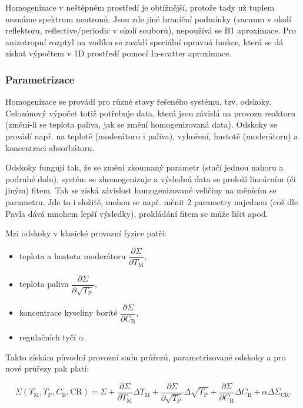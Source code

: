 Homogenizace v neštěpném prostředí je obtížnější, protože tady už tuplem neznáme spektrum neutronů. Jsou zde jiné hraniční podmínky (vacuum v okolí reflektoru, reflective/periodic v okolí souborů), nepoužívá se B1 aproximace. Pro anizotropní rozptyl na vodíku se zavádí speciální opravná funkce, která se dá získat výpočtem v 1D prostředí pomocí In-scatter aproximace.

\subsubsection{Parametrizace}

Homogenizace se provádí pro různé stavy řešeného systému, tzv. odskoky. Celozónový výpočet totiž potřebuje data, která jsou závislá na provozu reaktoru (změní-li se teplota paliva, jak se změní homogenizovaná data). Odskoky se provádí např. na teplotě (moderátoru i paliva), vyhoření, hustotě (moderátoru) a koncentraci absorbátoru.

Odskoky fungují tak, že se změní zkoumaný parametr (stačí jednou nahoru a podruhé dolu), systém se zhomogenizuje a výsledná data se proloží lineárním (či jiným) fitem. Tak se získá závislost homogenizované veličiny na měnícím se parametru. Jde to i složitě, mohou se např. měnit 2 parametry najednou (což dle Pavla dává mnohem lepší výsledky), prokládání fitem se může lišit apod.

Mzi odskoky v klasické provozní fyzice patří:

\begin{itemize}
  \item teplota a hustota moderátoru $\dfrac{\partial \Sigma}{\partial T_\text{M}}$,
  \item teplota paliva $\dfrac{\partial \Sigma}{\partial \sqrt{T_\text{P}}}$,
  \item koncentrace kyseliny borité $\dfrac{\partial \Sigma}{\partial C_\text{B}}$,
  \item regulačních tyčí $\alpha$.
\end{itemize}

Takto získám původní provozní sadu průřezů, parametrizované odskoky a pro nové průřezy pak platí:

\begin{equation}
  \boxed{
    \Sigma (T_\text{M}, T_\text{P}, C_\text{B}, \text{CR}) = \Sigma + \dfrac{\partial \Sigma}{\partial T_\text{M}} \Delta T_\text{M} + \dfrac{\partial \Sigma}{\partial \sqrt{T_\text{P}}} \Delta \sqrt{T_\text{P}} + \dfrac{\partial \Sigma}{\partial C_\text{B}} \Delta C_\text{B} + \alpha \Delta \Sigma_\text{CR}.}
\end{equation}

